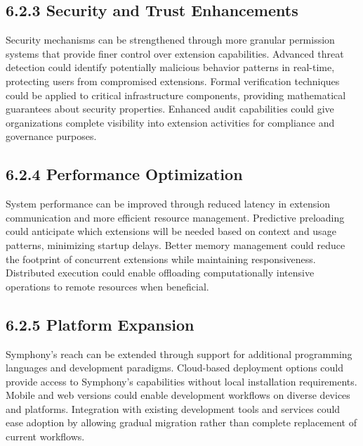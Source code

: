 \subsection*{6.2.3 Security and Trust Enhancements}

Security mechanisms can be strengthened through more granular permission systems that provide finer control over extension capabilities. Advanced threat detection could identify potentially malicious behavior patterns in real-time, protecting users from compromised extensions. Formal verification techniques could be applied to critical infrastructure components, providing mathematical guarantees about security properties. Enhanced audit capabilities could give organizations complete visibility into extension activities for compliance and governance purposes.

\subsection*{6.2.4 Performance Optimization}

System performance can be improved through reduced latency in extension communication and more efficient resource management. Predictive preloading could anticipate which extensions will be needed based on context and usage patterns, minimizing startup delays. Better memory management could reduce the footprint of concurrent extensions while maintaining responsiveness. Distributed execution could enable offloading computationally intensive operations to remote resources when beneficial.

\subsection*{6.2.5 Platform Expansion}

Symphony's reach can be extended through support for additional programming languages and development paradigms. Cloud-based deployment options could provide access to Symphony's capabilities without local installation requirements. Mobile and web versions could enable development workflows on diverse devices and platforms. Integration with existing development tools and services could ease adoption by allowing gradual migration rather than complete replacement of current workflows.


